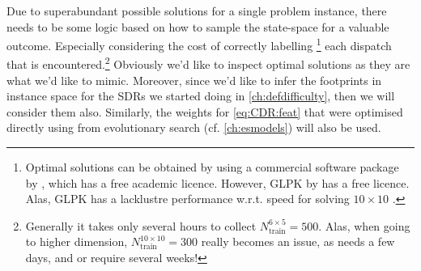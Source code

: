 Due to superabundant possible solutions for a single problem instance, 
there needs to be some logic based on how to sample the state-space for a 
valuable outcome. Especially considering the cost of correctly labelling 
\footnote{Optimal solutions can be obtained by using a commercial software 
    package by \citet{gurobi}, which has a free academic licence. However, GLPK 
    by \citet{glpk} has a free licence. Alas, GLPK has a lacklustre performance 
    w.r.t. speed for solving $10\times10$ \JSP.}
each dispatch that is encountered.\footnote{Generally it takes 
    only several hours to collect $N_{\text{train}}^{6\times5}=500$. Alas, when 
    going to higher dimension, $N_{\text{train}}^{10\times10}=300$ 
    really becomes an issue, as  needs a few days, and 
     or  require several weeks!}
Obviously we'd like to inspect optimal solutions as they are what we'd like to 
mimic. Moreover, since we'd like to infer the footprints in instance space for 
the SDRs we started doing in \cref{ch:defdifficulty}, then we will consider 
them also.
Similarly, the weights for \cref{eq:CDR:feat} that were optimised directly 
using from evolutionary search (cf. \cref{ch:esmodels}) will also be used.

